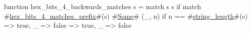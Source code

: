 function hex_bits_4_backwards_matches s = match s {
  s if match #\hyperref[sailRISCVzhexzybitszy4zymatcheszyprefix]{hex\_bits\_4\_matches\_prefix}#(s) {
    #\hyperref[sailRISCVzSome]{Some}# (_, n) if n == #\hyperref[sailRISCVzstringzylength]{string\_length}#(s) => true,
    _ => false
  } => true,
  _ => false
}
